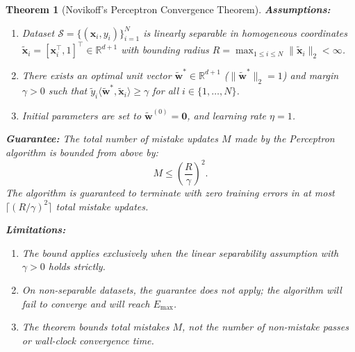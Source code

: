 \documentclass[11pt]{article}
\newtheorem{theorem}{Theorem}
\begin{document}
\begin{theorem}[Novikoff's Perceptron Convergence Theorem]
\label{thm:novikoff}
\textbf{Assumptions:}
\begin{enumerate}
    \item Dataset $\mathcal{S} = \{(\mathbf{x}_i, y_i)\}_{i=1}^N$ is linearly separable in homogeneous coordinates $\tilde{\mathbf{x}}_i = [\mathbf{x}_i^\top, 1]^\top \in \mathbb{R}^{d+1}$ with bounding radius $R = \max_{1 \le i \le N} \|\tilde{\mathbf{x}}_i\|_2 < \infty$.
    \item There exists an optimal unit vector $\tilde{\mathbf{w}}^* \in \mathbb{R}^{d+1}$ ($\|\tilde{\mathbf{w}}^*\|_2 = 1$) and margin $\gamma > 0$ such that $\tilde{y}_i \langle \tilde{\mathbf{w}}^*, \tilde{\mathbf{x}}_i \rangle \ge \gamma$ for all $i \in \{1, \dots, N\}$.
    \item Initial parameters are set to $\tilde{\mathbf{w}}^{(0)} = \mathbf{0}$, and learning rate $\eta = 1$.
\end{enumerate}

\textbf{Guarantee:}
The total number of mistake updates $M$ made by the Perceptron algorithm is bounded from above by:
\begin{equation}
\label{eq:novikoff_bound}
M \le \left( \frac{R}{\gamma} \right)^2.
\end{equation}
The algorithm is guaranteed to terminate with zero training errors in at most $\lceil (R/\gamma)^2 \rceil$ total mistake updates.

\textbf{Limitations:}
\begin{enumerate}
    \item The bound applies exclusively when the linear separability assumption with $\gamma > 0$ holds strictly.
    \item On non-separable datasets, the guarantee does not apply; the algorithm will fail to converge and will reach $E_{\max}$.
    \item The theorem bounds total mistakes $M$, not the number of non-mistake passes or wall-clock convergence time.
\end{enumerate}
\end{theorem}
\end{document}
